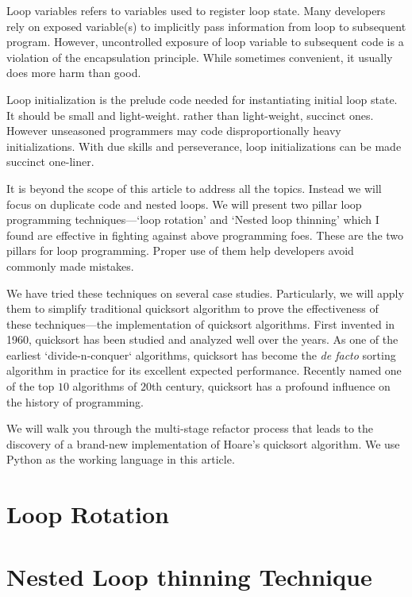 \documentclass[a4paper,titlepage]{article}
\begin{document}
    Loop variables refers to variables used to register loop state.
    Many developers rely on exposed variable(s) to implicitly pass information from loop to
    subsequent program.
    However, uncontrolled exposure of loop variable to subsequent code is a violation of the
    encapsulation principle.
    While sometimes convenient, it usually does more harm than good.


    Loop initialization is the prelude code needed for instantiating initial loop state.
    It should be small and light-weight.
    rather than light-weight, succinct ones.
    However unseasoned programmers may code disproportionally heavy initializations.
    With due skills and perseverance, loop initializations can be made succinct one-liner.


    It is beyond the scope of this article to address all the topics.
    Instead we will focus on duplicate code and nested loops.
    We will present two pillar loop programming techniques---`loop rotation' and `Nested loop
    thinning' which I found are effective in fighting against above programming foes.
    These are the two pillars for loop programming.
    Proper use of them help developers avoid commonly made mistakes.


    We have tried these techniques on several case studies.
    Particularly, we will apply them to simplify traditional quicksort algorithm to prove the
    effectiveness of these techniques---the implementation of quicksort algorithms.
    First invented in 1960, quicksort has been studied and analyzed well over the
    years\cite{Hoare1961,Hoare1962,sedgewick:1978,Bentley:1986:PP}.
    As one of the earliest `divide-n-conquer` algorithms, quicksort has become the
    \textit{de facto} sorting algorithm in practice for its excellent expected performance.
    Recently named one of the top $10$ algorithms of $20$th century, quicksort has a
    profound influence on the history of programming\cite{top10algorithm:2000}.


    We will walk you through the multi-stage refactor process that leads to the discovery of a
    brand-new implementation of Hoare's quicksort algorithm.
    We use Python as the working language in this article.


    \section{Loop Rotation}\label{sec:loop-rotation}
    

    \section{Nested Loop thinning Technique}\label{sec:loop-thinning-technique}
    
\end{document}

